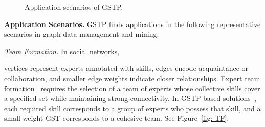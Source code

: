 \begin{figure}[t]


  \caption{Application scenarios of GSTP.}
  \label{fig: application}
\end{figure}


\textbf{Application Scenarios.}
GSTP finds applications in the following representative scenarios in graph data management and mining.

\textit{Team Formation.} In social networks,

vertices represent experts annotated with skills, edges encode acquaintance or collaboration, and smaller edge weights indicate closer relationships. Expert team formation~\cite{TF_4, TF_5} requires the selection of a team of experts whose collective skills cover a specified set while maintaining strong connectivity. In GSTP-based solutions~\cite{TF_3, ImprovAPP}, each required skill corresponds to a group of experts who possess that skill, and a small-weight GST corresponds to a cohesive team. See Figure~\ref{fig: TF}.

